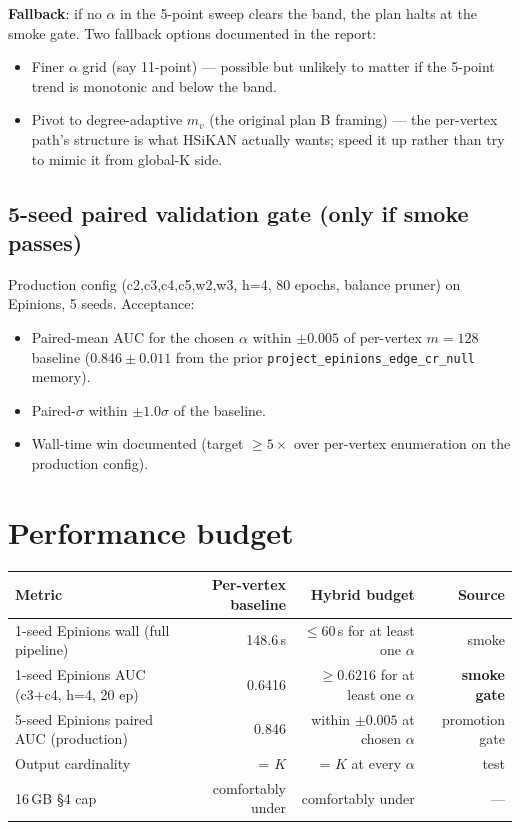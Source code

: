 \documentclass[a4paper,11pt]{article}
\begin{document}
\textbf{Fallback}: if no $\alpha$ in the 5-point sweep clears the
band, the plan halts at the smoke gate.  Two fallback options
documented in the report:
\begin{itemize}
  \item Finer $\alpha$ grid (say 11-point) — possible but unlikely to
    matter if the 5-point trend is monotonic and below the band.
  \item Pivot to degree-adaptive $m_v$ (the original plan B framing) —
    the per-vertex path's structure is what HSiKAN actually wants;
    speed it up rather than try to mimic it from global-K side.
\end{itemize}

\subsection*{5-seed paired validation gate (only if smoke passes)}

Production config (c2,c3,c4,c5,w2,w3, h=4, 80 epochs, balance
pruner) on Epinions, 5 seeds.  Acceptance:
\begin{itemize}
  \item Paired-mean AUC for the chosen $\alpha$ within $\pm 0.005$ of
    per-vertex $m{=}128$ baseline ($0.846 \pm 0.011$ from the prior
    \texttt{project\_epinions\_edge\_cr\_null} memory).
  \item Paired-$\sigma$ within $\pm 1.0\sigma$ of the baseline.
  \item Wall-time win documented (target $\ge 5\times$ over per-vertex
    enumeration on the production config).
\end{itemize}

\section*{Performance budget}

\begin{center}
\begin{tabular}{lrrr}
\toprule
Metric & Per-vertex baseline & Hybrid budget & Source \\
\midrule
1-seed Epinions wall (full pipeline) & 148.6\,s & $\le 60$\,s for at least one $\alpha$ & smoke \\
1-seed Epinions AUC (c3+c4, h=4, 20 ep) & 0.6416 & $\ge 0.6216$ for at least one $\alpha$ & \textbf{smoke gate} \\
5-seed Epinions paired AUC (production) & 0.846 & within $\pm 0.005$ at chosen $\alpha$ & promotion gate \\
Output cardinality & = $K$ & = $K$ at every $\alpha$ & test \\
16\,GB \S4 cap & comfortably under & comfortably under & — \\
\bottomrule
\end{tabular}
\end{center}
\end{document}
